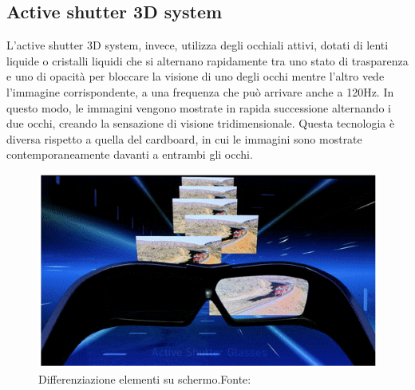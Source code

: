 \documentclass[
a4paper,
cleardoublepage=empty,
headings=twolinechapter,
numbers=autoenddot,
]{scrbook}
\begin{document}
	\subsection{Active shutter 3D system}
	L'active shutter 3D system, invece, utilizza degli occhiali attivi, dotati di lenti liquide o cristalli liquidi che si alternano rapidamente tra uno stato di trasparenza e uno di opacità per bloccare la visione di uno degli occhi mentre l'altro vede l'immagine corrispondente, a una frequenza che può arrivare anche a 120Hz. In questo modo, le immagini vengono mostrate in rapida successione alternando i due occhi, creando la sensazione di visione tridimensionale. Questa tecnologia è diversa rispetto a quella del cardboard, in cui le immagini sono mostrate contemporaneamente davanti a entrambi gli occhi.
	\begin{figure}[H]
		\centering
		\includegraphics[width=0.6\linewidth]{image/active-shutter-3d-technology}
		\caption{Differenziazione elementi su schermo.Fonte:\cite{active-shutter-3d_image}}
		\label{fig:occhiali active-shutter-3d-technology}
	\end{figure}
	
\end{document}
